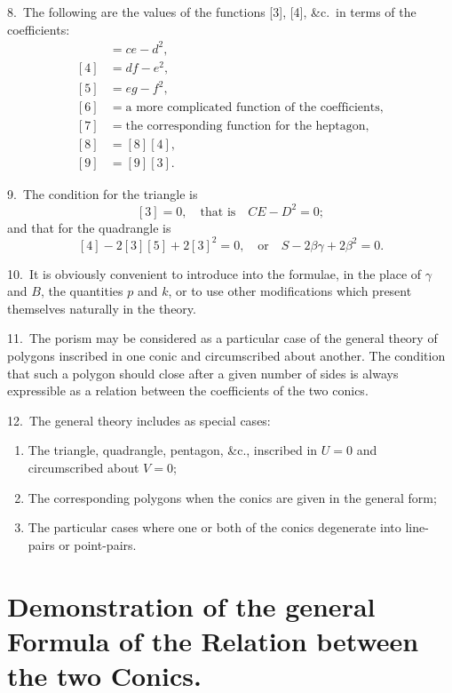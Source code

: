 \documentclass[11pt,a4paper]{article}
\theoremstyle{plain}
\theoremstyle{definition}
\theoremstyle{remark}
\begin{document}
\newpage
\setcounter{page}{313}

8.\ The following are the values of the functions [3], [4], \&c.\ in terms of the coefficients:
\begin{align*}
[3] &= ce-d^2, \\
[4] &= df-e^2, \\
[5] &= eg-f^2, \\
[6] &= \text{a more complicated function of the coefficients}, \\
[7] &= \text{the corresponding function for the heptagon}, \\
[8] &= [8][4], \\
[9] &= [9][3].
\end{align*}

9.\ The condition for the triangle is
\[
[3] = 0,\quad \text{that is}\quad CE-D^2=0;
\]
and that for the quadrangle is
\[
[4]-2[3][5]+2[3]^2=0,\quad \text{or}\quad S-2\beta\gamma+2\beta^2=0.
\]

10.\ It is obviously convenient to introduce into the formulae, in the place of $\gamma$ and $B$, the quantities $p$ and $k$, or to use other modifications which present themselves naturally in the theory.

\newpage
\setcounter{page}{314}

11.\ The porism may be considered as a particular case of the general theory of polygons inscribed in one conic and circumscribed about another. The condition that such a polygon should close after a given number of sides is always expressible as a relation between the coefficients of the two conics.

12.\ The general theory includes as special cases:
\begin{enumerate}
\item[(I.)] The triangle, quadrangle, pentagon, \&c., inscribed in $U=0$ and circumscribed about $V=0$;
\item[(II.)] The corresponding polygons when the conics are given in the general form;
\item[(III.)] The particular cases where one or both of the conics degenerate into line-pairs or point-pairs.
\end{enumerate}

\newpage
\setcounter{page}{315}

\section*{Demonstration of the general Formula of the Relation between the two Conics.}
\end{document}
